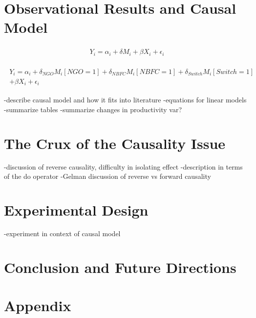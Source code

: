 \documentclass[12pt]{article}
\begin{document}
\section{Observational Results and Causal Model}

\begin{align} 
\begin{split}
Y_i = \alpha_i + \delta M_i + \beta X_i + \epsilon_i
\end{split}					
\end{align}

\begin{align} 
\begin{split}
Y_i = \alpha_i + \delta_{NGO} M_i  [NGO=1]+ \delta_{NBFC} M_i  [NBFC=1] + \delta_{Switch} M_i  [Switch=1] \\
 +  \beta X_i + \epsilon_i
\end{split}					
\end{align}


-describe causal model and how it fits into literature
-equations for linear models
-summarize tables
-summarize changes in productivity var? 


\section{The Crux of the Causality Issue}

-discussion of reverse causality, difficulty in isolating effect
-description in terms of the do operator
-Gelman discussion of reverse vs forward causality

\section{Experimental Design}

-experiment in context of causal model

\section{Conclusion and Future Directions}

\section*{Appendix}
\end{document}
